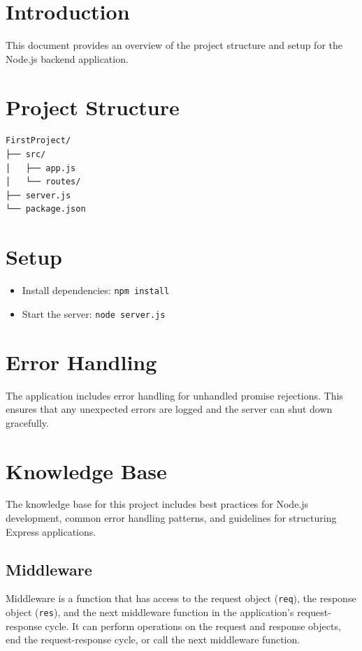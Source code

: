\section{Introduction}
This document provides an overview of the project structure and setup for the Node.js backend application.

\section{Project Structure}
\begin{verbatim}
FirstProject/
├── src/
│   ├── app.js
│   └── routes/
├── server.js
└── package.json
\end{verbatim}

\section{Setup}
\begin{itemize}
  \item Install dependencies: \texttt{npm install}
  \item Start the server: \texttt{node server.js}
\end{itemize}

\section{Error Handling}
The application includes error handling for unhandled promise rejections. This ensures that any unexpected errors are logged and the server can shut down gracefully.

\section{Knowledge Base}
The knowledge base for this project includes best practices for Node.js development, common error handling patterns, and guidelines for structuring Express applications.

\subsection{Middleware}

Middleware is a function that has access to the request object (\texttt{req}), the response object (\texttt{res}), and the next middleware function in the application’s request-response cycle. It can perform operations on the request and response objects, end the request-response cycle, or call the next middleware function.

